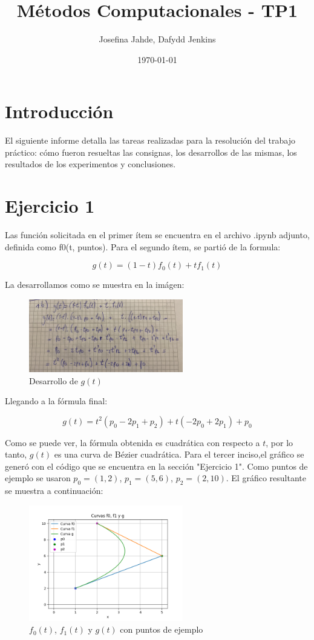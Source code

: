 \documentclass{article}
\title{Métodos Computacionales - TP1}
\author{Josefina Jahde, Dafydd Jenkins}
\date{\today}
\begin{document}
\maketitle

\section*{Introducción}
El siguiente informe detalla las tareas realizadas para la resolución del trabajo práctico: cómo fueron resueltas las consignas, los desarrollos de las mismas, los resultados de los experimentos y conclusiones.


\section*{Ejercicio 1}
Las función solicitada en el primer ítem se encuentra en el archivo .ipynb adjunto, definida como f0(t, puntos).
Para el segundo ítem, se partió de la formula:

$$
g(t) = (1 - t)f_0(t) + t f_1(t)
$$

La desarrollamos como se muestra en la imágen:

\begin{figure}[H]
    \centering
    \includegraphics[width=0.6\textwidth]{imagenes/1b.jpg}
    \caption{Desarrollo de $g(t)$}
    \label{fig:ejemplo}
\end{figure}

Llegando a la fórmula final:

$$
g(t) = t^2 (p_0 - 2 p_1 + p_2) + t (-2 p_0 + 2 p_1) + p_0
$$

Como se puede ver, la fórmula obtenida es cuadrática con respecto a $t$, por lo tanto, $g(t)$ es una curva de Bézier cuadrática.
Para el tercer inciso,el gráfico se generó con el código que se encuentra en la sección "Ejercicio 1". Como puntos de ejemplo se usaron $p_0 = (1, 2)$, $p_1 = (5, 6)$, $p_2 = (2, 10)$. El gráfico resultante se muestra  a continuación:

\begin{figure}[H]
    \centering
    \includegraphics[width=0.6\textwidth]{imagenes/graf_ej1.png}
    \caption{$f_0(t)$, $f_1(t)$ y $g(t)$ con puntos de ejemplo}
    \label{fig:ejemplo}
\end{figure}
\end{document}
